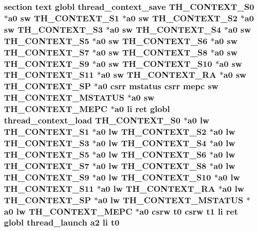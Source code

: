 {\subsubsection[{t0}]{\setlength{\rightskip}{0pt plus 5cm}section text globl {\bf thread\-\_\-context\-\_\-save} {\bf T\-H\-\_\-\-C\-O\-N\-T\-E\-X\-T\-\_\-\-S0} $\ast${\bf a0} {\bf sw} {\bf T\-H\-\_\-\-C\-O\-N\-T\-E\-X\-T\-\_\-\-S1} $\ast${\bf a0} {\bf sw} {\bf T\-H\-\_\-\-C\-O\-N\-T\-E\-X\-T\-\_\-\-S2} $\ast${\bf a0} {\bf sw} {\bf T\-H\-\_\-\-C\-O\-N\-T\-E\-X\-T\-\_\-\-S3} $\ast${\bf a0} {\bf sw} {\bf T\-H\-\_\-\-C\-O\-N\-T\-E\-X\-T\-\_\-\-S4} $\ast${\bf a0} {\bf sw} {\bf T\-H\-\_\-\-C\-O\-N\-T\-E\-X\-T\-\_\-\-S5} $\ast${\bf a0} {\bf sw} {\bf T\-H\-\_\-\-C\-O\-N\-T\-E\-X\-T\-\_\-\-S6} $\ast${\bf a0} {\bf sw} {\bf T\-H\-\_\-\-C\-O\-N\-T\-E\-X\-T\-\_\-\-S7} $\ast${\bf a0} {\bf sw} {\bf T\-H\-\_\-\-C\-O\-N\-T\-E\-X\-T\-\_\-\-S8} $\ast${\bf a0} {\bf sw} {\bf T\-H\-\_\-\-C\-O\-N\-T\-E\-X\-T\-\_\-\-S9} $\ast${\bf a0} {\bf sw} {\bf T\-H\-\_\-\-C\-O\-N\-T\-E\-X\-T\-\_\-\-S10} $\ast${\bf a0} {\bf sw} {\bf T\-H\-\_\-\-C\-O\-N\-T\-E\-X\-T\-\_\-\-S11} $\ast${\bf a0} {\bf sw} {\bf T\-H\-\_\-\-C\-O\-N\-T\-E\-X\-T\-\_\-\-R\-A} $\ast${\bf a0} {\bf sw} {\bf T\-H\-\_\-\-C\-O\-N\-T\-E\-X\-T\-\_\-\-S\-P} $\ast${\bf a0} csrr {\bf mstatus} csrr {\bf mepc} {\bf sw} {\bf T\-H\-\_\-\-C\-O\-N\-T\-E\-X\-T\-\_\-\-M\-S\-T\-A\-T\-U\-S} $\ast${\bf a0} {\bf sw} {\bf T\-H\-\_\-\-C\-O\-N\-T\-E\-X\-T\-\_\-\-M\-E\-P\-C} $\ast${\bf a0} {\bf li} ret globl {\bf thread\-\_\-context\-\_\-load} {\bf T\-H\-\_\-\-C\-O\-N\-T\-E\-X\-T\-\_\-\-S0} $\ast${\bf a0} {\bf lw} {\bf T\-H\-\_\-\-C\-O\-N\-T\-E\-X\-T\-\_\-\-S1} $\ast${\bf a0} {\bf lw} {\bf T\-H\-\_\-\-C\-O\-N\-T\-E\-X\-T\-\_\-\-S2} $\ast${\bf a0} {\bf lw} {\bf T\-H\-\_\-\-C\-O\-N\-T\-E\-X\-T\-\_\-\-S3} $\ast${\bf a0} {\bf lw} {\bf T\-H\-\_\-\-C\-O\-N\-T\-E\-X\-T\-\_\-\-S4} $\ast${\bf a0} {\bf lw} {\bf T\-H\-\_\-\-C\-O\-N\-T\-E\-X\-T\-\_\-\-S5} $\ast${\bf a0} {\bf lw} {\bf T\-H\-\_\-\-C\-O\-N\-T\-E\-X\-T\-\_\-\-S6} $\ast${\bf a0} {\bf lw} {\bf T\-H\-\_\-\-C\-O\-N\-T\-E\-X\-T\-\_\-\-S7} $\ast${\bf a0} {\bf lw} {\bf T\-H\-\_\-\-C\-O\-N\-T\-E\-X\-T\-\_\-\-S8} $\ast${\bf a0} {\bf lw} {\bf T\-H\-\_\-\-C\-O\-N\-T\-E\-X\-T\-\_\-\-S9} $\ast${\bf a0} {\bf lw} {\bf T\-H\-\_\-\-C\-O\-N\-T\-E\-X\-T\-\_\-\-S10} $\ast${\bf a0} {\bf lw} {\bf T\-H\-\_\-\-C\-O\-N\-T\-E\-X\-T\-\_\-\-S11} $\ast${\bf a0} {\bf lw} {\bf T\-H\-\_\-\-C\-O\-N\-T\-E\-X\-T\-\_\-\-R\-A} $\ast${\bf a0} {\bf lw} {\bf T\-H\-\_\-\-C\-O\-N\-T\-E\-X\-T\-\_\-\-S\-P} $\ast${\bf a0} {\bf lw} {\bf T\-H\-\_\-\-C\-O\-N\-T\-E\-X\-T\-\_\-\-M\-S\-T\-A\-T\-U\-S} $\ast${\bf a0} {\bf lw} {\bf T\-H\-\_\-\-C\-O\-N\-T\-E\-X\-T\-\_\-\-M\-E\-P\-C} $\ast${\bf a0} csrw t0 csrw {\bf t1} {\bf li} ret globl {\bf thread\-\_\-launch} {\bf a2} {\bf li} t0}}\label{riscv_2atomic_8S_ae9747d0e53eec3077df6659993460c34}


